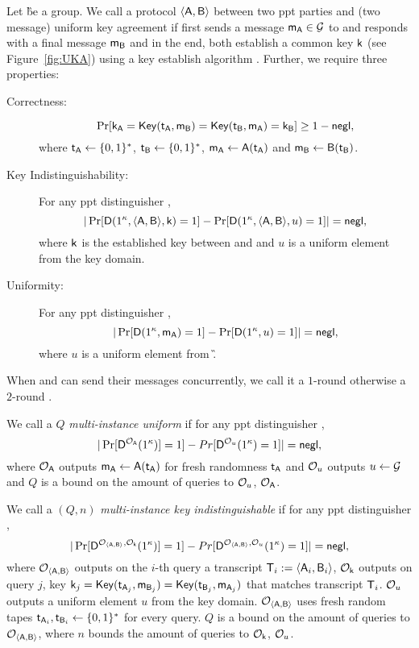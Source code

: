 \begin{definition} 
Let \G be a group.
We call a protocol $\langle \mathsf{A},\mathsf{B}\rangle$ between two ppt parties \A and \B (two message) uniform key agreement if \A first sends a message $\mathsf{m}_\mathsf{A}\in\mathcal{G}$ to \B and \B responds with a final message $\mathsf{m}_\mathsf{B}$ and in the end, both establish a common key $\mathsf{k}$ (see Figure~\ref{fig:UKA}) using a key establish algorithm \EK. Further, we require three properties:
\begin{description}
\item[Correctness:]
$$
\Pr[\mathsf{k}_\mathsf{A}=\mathsf{Key}(\mathsf{t}_\mathsf{A},\mathsf{m}_\mathsf{B})=\mathsf{Key}(\mathsf{t}_\mathsf{B},\mathsf{m}_\mathsf{A})=\mathsf{k}_\mathsf{B}]\geq 1-\mathsf{negl},
$$
where $\mathsf{t}_\mathsf{A}\leftarrow\{0,1\}^*$, $\mathsf{t}_\mathsf{B}\leftarrow\{0,1\}^*$, $\mathsf{m}_\mathsf{A}\leftarrow\mathsf{A}(\mathsf{t}_\mathsf{A})$ and $\mathsf{m}_\mathsf{B}\leftarrow\mathsf{B}(\mathsf{t}_\mathsf{B})$.
\item [Key Indistinguishability:] For any ppt distinguisher \D,
$$ 
|\Pr[\mathsf D(1^\kappa,\langle \mathsf{A},\mathsf{B}\rangle, \mathsf{k})=1]-\Pr[\mathsf D(1^\kappa,\langle \mathsf{A},\mathsf{B}\rangle, u)=1]|=\mathsf{negl},
$$
where $\mathsf{k}$ is the established key between \A and \B and $u$ is a uniform element from the key domain.
\item [Uniformity:] For any ppt distinguisher \D, 
$$
|\Pr[\mathsf D(1^\kappa,\mathsf{m}_\mathsf{A})=1]-\Pr[\mathsf D( 1^\kappa,u)=1]|=\mathsf{negl},
$$
where $u$ is a uniform element from \G.
\end{description}
When \A and \B can send their messages concurrently, we call it a $1$-round \UKA otherwise a $2$-round \UKA.
\end{definition}

\begin{definition}
We call a \UKA $Q$ \emph{multi-instance uniform} if for any ppt distinguisher \D,
$$
|\Pr[\mathsf D^{\mathcal O_{\mathsf{A}}}(1^{\kappa})]=1]-Pr[\mathsf D^{\mathcal O_{u}}(1^{\kappa})=1]|=\mathsf{negl},
$$
where $\mathcal O_{\mathsf{A}}$ outputs $\mathsf{m}_\mathsf{A}\leftarrow\mathsf{A}(\mathsf{t}_\mathsf{A})$ for fresh randomness $\mathsf{t}_\mathsf{A}$ and $\mathcal O_u$ outputs $u\leftarrow\mathcal{G}$ and $Q$ is a bound on the amount of queries to $\mathcal O_{u}$, $\mathcal O_{\mathsf{A}}$.
\end{definition}



\begin{definition}
We call a \UKA $(Q,n)$ \emph{multi-instance key indistinguishable} if for any ppt distinguisher \D,
$$
|\Pr[\mathsf D^{\mathcal O_{\langle \mathsf{A},\mathsf{B}\rangle}, \mathcal O_{\mathsf{k}}}(1^{\kappa})]=1]-Pr[\mathsf D^{\mathcal O_{\langle \mathsf{A},\mathsf{B}\rangle},\mathcal O_{u}}(1^{\kappa})=1]|=\mathsf{negl},
$$
where $\mathcal O_{\langle \mathsf{A},\mathsf{B}\rangle}$ outputs on the $i$-th query a transcript $\mathsf{T}_i:=\langle \mathsf{A}_i,\mathsf{B}_i\rangle$, $\mathcal O_{\mathsf{k}}$ outputs on query $j$, key $\mathsf{k}_j=\mathsf{Key}(\mathsf{t}_{\mathsf{A}_j},\mathsf{m}_{\mathsf{B}_j})=\mathsf{Key}(\mathsf{t}_{\mathsf{B}_j},\mathsf{m}_{\mathsf{A}_j})$ that matches transcript $\mathsf{T}_i$. $\mathcal O_u$ outputs a uniform element $u$ from the key domain. $\mathcal O_{\langle \mathsf{A},\mathsf{B}\rangle}$ uses fresh random tapes $\mathsf{t}_{\mathsf{A}_i},\mathsf{t}_{\mathsf{B}_i}\leftarrow\{0,1\}^*$ for every query. $Q$ is a bound on the amount of queries to $\mathcal O_{\langle \mathsf{A},\mathsf{B}\rangle}$, where $n$ bounds the amount of queries to $\mathcal O_{\mathsf{k}}$, $\mathcal O_{u}$. 
\end{definition}

